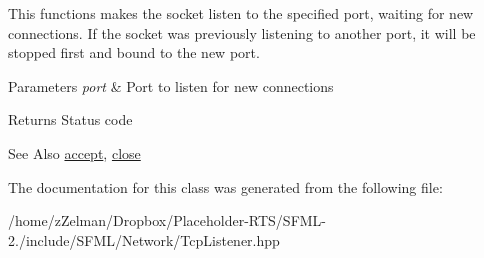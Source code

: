 This functions makes the socket listen to the specified port, waiting for new connections. If the socket was previously listening to another port, it will be stopped first and bound to the new port.


\begin{DoxyParams}{Parameters}
{\em port} & Port to listen for new connections\\
\hline
\end{DoxyParams}
\begin{DoxyReturn}{Returns}
Status code
\end{DoxyReturn}
\begin{DoxySeeAlso}{See Also}
\hyperlink{classsf_1_1TcpListener_ae2c83ce5a64d50b68180c46bef0a7346}{accept}, \hyperlink{classsf_1_1TcpListener_a3a00a850506bd0f9f48867a0fe59556b}{close} 
\end{DoxySeeAlso}


The documentation for this class was generated from the following file\-:\begin{DoxyCompactItemize}
\item 
/home/z\-Zelman/\-Dropbox/\-Placeholder-\/\-R\-T\-S/\-S\-F\-M\-L-\/2./include/\-S\-F\-M\-L/\-Network/Tcp\-Listener.\-hpp\end{DoxyCompactItemize}
